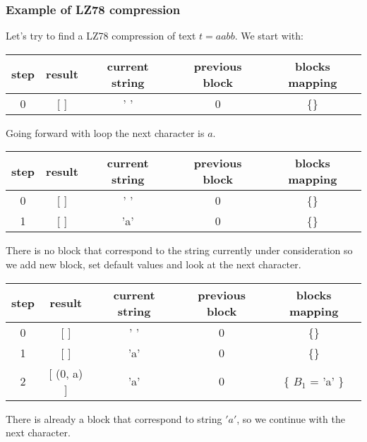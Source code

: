 \subsubsection{Example of LZ78 compression}

Let's try to find a LZ78 compression of text $t = aabb$. We start with:

\begin{table}[H]
\begin{center}
\begin{tabular}{|c|c|c|c|c|}
\hline
\rowcolor[HTML]{C0C0C0} 
step  & result & current string & previous block & blocks mapping \\ \hline
0                 & {[} {]} & ' '             & 0              & \{\}           \\ \hline
\end{tabular}

\end{center}
\end{table}
Going forward with loop the next character is $a$.

\begin{table}[H]
\begin{center}
\begin{tabular}{|c|c|c|c|c|}
\hline
\rowcolor[HTML]{C0C0C0} 
step & result  & current string & previous block & blocks mapping \\ \hline
0                & {[} {]} & ' '            & 0              & \{\}           \\ \hline
1               & {[} {]} & 'a'            & 0              & \{\}           \\ \hline
\end{tabular}
\end{center}
\end{table}
There is no block that correspond to the string currently under consideration so we add new block, set default values and look at the next character.

\begin{table}[H]
\begin{center}
\begin{tabular}{|c|c|c|c|c|}
\hline
\rowcolor[HTML]{C0C0C0} 
step  & result         & current string & previous block & blocks mapping   \\ \hline
0               & {[} {]}        & ' '            & 0              & \{\}             \\ \hline
1              & {[} {]}        & 'a'            & 0              & \{\}             \\ \hline
2             & {[} (0, a) {]} & 'a'            & 0              & \{ $B_1$ = 'a' \} \\ \hline
\end{tabular}
    
\end{center}
\end{table}
There is already a block that correspond to string $'a'$, so we continue with the next character.

